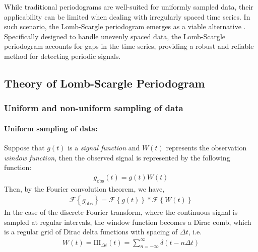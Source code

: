     		While traditional periodograms are well-suited for uniformly sampled data, their applicability can be limited when dealing with irregularly spaced time series. In such scenario, the Lomb-Scargle periodogram emerges as a viable alternative \cite{lomb1976least,scargle1982studies}. Specifically designed to handle unevenly spaced data, the Lomb-Scargle periodogram accounts for gaps in the time series, providing a robust and reliable method for detecting periodic signals.
    		
    	\subsection{Theory of Lomb-Scargle Periodogram}
    	
    		\subsubsection{Uniform and non-uniform sampling of data}
    			\paragraph{Uniform sampling of data:}
    			Suppose that $g(t)$ is a \textit{signal function} and $W(t)$ represents the observation \textit{window function}, then the observed signal is represented by the following function:
    			\begin{align}
    				g_\text{obs}(t)=g(t)W(t) \label{eqn:obs-func}
    			\end{align}
    			Then, by the Fourier convolution theorem, we have,
    			\begin{align}
    				\mathscr{F}\left\lbrace g_\text{obs} \right\rbrace = \mathscr{F}\left\lbrace g(t) \right\rbrace * \mathscr{F}\left\lbrace W(t) \right\rbrace \label{eqn:FT-obs-func}
    			\end{align}
    			In the case of the discrete Fourier transform, where the continuous signal is sampled at regular intervals, the window function becomes a Dirac comb, which is a regular grid of Dirac delta functions with spacing of $\Delta t$, i.e.
    			\begin{align}
    				W(t)=\text{III}_{\Delta t}(t)=\sum_{n=-\infty}^{\infty}{\delta(t-n\Delta t)} \label{eqn:dirac-comb}
    			\end{align}
    			
